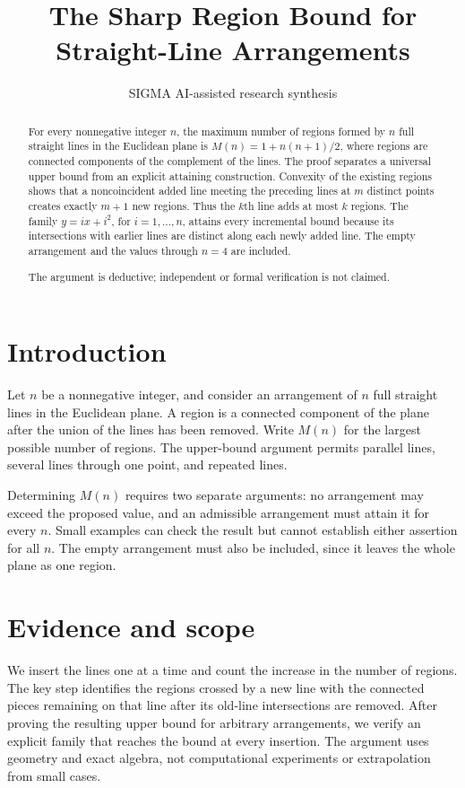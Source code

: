 \documentclass[11pt]{article}
\title{The Sharp Region Bound for Straight-Line Arrangements}
\date{}
\author{SIGMA AI-assisted research synthesis}
\begin{document}
\maketitle

\begin{abstract}
For every nonnegative integer $n$, the maximum number of regions formed by $n$ full straight lines in the Euclidean plane is $M(n)=1+n(n+1)/2$, where regions are connected components of the complement of the lines. The proof separates a universal upper bound from an explicit attaining construction. Convexity of the existing regions shows that a noncoincident added line meeting the preceding lines at $m$ distinct points creates exactly $m+1$ new regions. Thus the $k$th line adds at most $k$ regions. The family $y=ix+i^2$, for $i=1,\ldots,n$, attains every incremental bound because its intersections with earlier lines are distinct along each newly added line. The empty arrangement and the values through $n=4$ are included.

The argument is deductive; independent or formal verification is not claimed.
\end{abstract}
\section{Introduction}
Let $n$ be a nonnegative integer, and consider an arrangement of $n$ full straight lines in the Euclidean plane. A region is a connected component of the plane after the union of the lines has been removed. Write $M(n)$ for the largest possible number of regions. The upper-bound argument permits parallel lines, several lines through one point, and repeated lines.

Determining $M(n)$ requires two separate arguments: no arrangement may exceed the proposed value, and an admissible arrangement must attain it for every $n$. Small examples can check the result but cannot establish either assertion for all $n$. The empty arrangement must also be included, since it leaves the whole plane as one region.

\section{Evidence and scope}
We insert the lines one at a time and count the increase in the number of regions. The key step identifies the regions crossed by a new line with the connected pieces remaining on that line after its old-line intersections are removed. After proving the resulting upper bound for arbitrary arrangements, we verify an explicit family that reaches the bound at every insertion. The argument uses geometry and exact algebra, not computational experiments or extrapolation from small cases.
\end{document}
